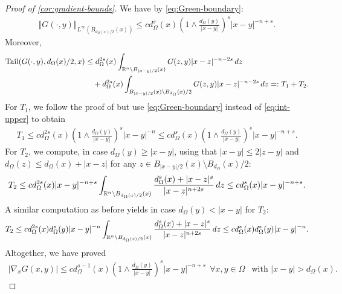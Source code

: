 \documentclass[11pt,reqno]{amsart}
\theoremstyle{plain}
\theoremstyle{definition}
\numberwithin{equation}{section}
\newcommand{\R}{\mathbb{R}}
\newcommand{\1}{\mathbbm{1}}
\DeclareMathOperator{\tail}{Tail}
\renewcommand{\d}{\textnormal{\,d}}
\begin{document}
\begin{proof}[Proof of \autoref{cor:gradient-bounds}]
We have by \eqref{eq:Green-boundary}:
\vspace{-0.3cm}
\begin{align*}
\Vert G(\cdot,y) \Vert_{L^{\infty}(B_{d_{\Omega}(x)/2}(x))} \le c d_{\Omega}^s(x) \left( 1 \wedge \frac{d_{\Omega}(y)}{|x-y|} \right)^s |x-y|^{-n+s}.
\end{align*}
Moreover, 
\begin{align*}
\tail(G(\cdot,y), d_{\Omega}(x)/2 , x) &\le d_{\Omega}^{2s}(x)\int_{\R^n \setminus B_{|x-y|/2}(x)} G(z,y) |x-z|^{-n-2s} \d z \\
&\quad + d_{\Omega}^{2s}(x) \int_{B_{|x-y|/2}(x) \setminus B_{d_{\Omega}}(x)/2} G(z,y) |x-z|^{-n-2s} \d z =: T_1 + T_2.
\end{align*}
For $T_1$, we follow the proof of \cite[(4.14)-(4.16)]{KKL23} but use \eqref{eq:Green-boundary} instead of \eqref{eq:int-upper} to obtain
\begin{align*}
T_1 \le cd_{\Omega}^{2s}(x) \left( 1 \wedge \frac{d_{\Omega}(y)}{|x-y|} \right)^s |x-y|^{-n} \le c d_{\Omega}^{s}(x) \left( 1 \wedge \frac{d_{\Omega}(y)}{|x-y|} \right)^s |x-y|^{-n + s}.
\end{align*}
For $T_2$, we compute, in case $d_{\Omega}(y) \ge |x-y|$, using that $|x-y| \le 2|z-y|$ and $d_{\Omega}(z) \le d_{\Omega}(x) + |x-z|$ for any $z \in B_{|x-y|/2}(x) \setminus B_{d_{\Omega}}(x)/2$:
\begin{align*}
T_2 \le c d_{\Omega}^{2s}(x) |x-y|^{-n+s} \int_{\R^n \setminus B_{d_{\Omega}(x)/2}(x)} \frac{d_{\Omega}^s(x)+|x-z|^s}{|x-z|^{n+2s}} \d z \le c d^{s}_{\Omega}(x) |x-y|^{-n+s}.
\end{align*}
A similar computation as before yields in case $d_{\Omega}(y) < |x-y|$ for $T_2$:
\begin{align*}
    T_2 \le c d_{\Omega}^{2s}(x) d_{\Omega}^s(y) |x-y|^{-n} \int_{\R^n \setminus B_{d_{\Omega}(x)/2}(x)} \frac{d_{\Omega}^s(x) + |x-z|^s}{|x-z|^{n+2s}} \d z \le c d^{s}_{\Omega}(x)d^s_{\Omega}(y) |x-y|^{-n}.
\end{align*}
Altogether, we have proved
\begin{align*}
    |\nabla_x G(x,y)| \le c d_{\Omega}^{s-1}(x) \left( 1 \wedge \frac{d_{\Omega}(y)}{|x-y|} \right)^s |x-y|^{-n+s} ~~ \forall x,y \in \Omega ~~ \text{ with } |x-y| > d_{\Omega}(x).
\end{align*}
\end{proof}
\end{document}
